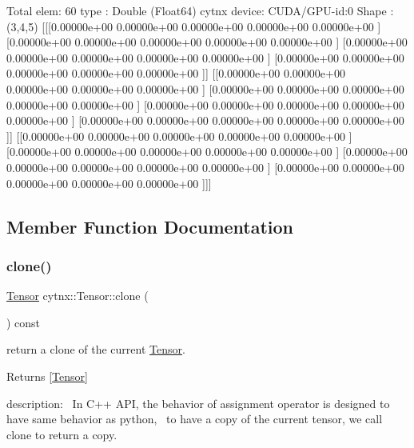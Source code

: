\begin{DoxyVerbInclude}
Total elem: 60
type  : Double (Float64)
cytnx device: CUDA/GPU-id:0
Shape : (3,4,5)
[[[0.00000e+00 0.00000e+00 0.00000e+00 0.00000e+00 0.00000e+00 ]
  [0.00000e+00 0.00000e+00 0.00000e+00 0.00000e+00 0.00000e+00 ]
  [0.00000e+00 0.00000e+00 0.00000e+00 0.00000e+00 0.00000e+00 ]
  [0.00000e+00 0.00000e+00 0.00000e+00 0.00000e+00 0.00000e+00 ]]
 [[0.00000e+00 0.00000e+00 0.00000e+00 0.00000e+00 0.00000e+00 ]
  [0.00000e+00 0.00000e+00 0.00000e+00 0.00000e+00 0.00000e+00 ]
  [0.00000e+00 0.00000e+00 0.00000e+00 0.00000e+00 0.00000e+00 ]
  [0.00000e+00 0.00000e+00 0.00000e+00 0.00000e+00 0.00000e+00 ]]
 [[0.00000e+00 0.00000e+00 0.00000e+00 0.00000e+00 0.00000e+00 ]
  [0.00000e+00 0.00000e+00 0.00000e+00 0.00000e+00 0.00000e+00 ]
  [0.00000e+00 0.00000e+00 0.00000e+00 0.00000e+00 0.00000e+00 ]
  [0.00000e+00 0.00000e+00 0.00000e+00 0.00000e+00 0.00000e+00 ]]]





\end{DoxyVerbInclude}
 

\subsection{Member Function Documentation}
\mbox{\label{classcytnx_1_1Tensor_a5e2248e9babdb786167ed349df9084ae}} 
\subsubsection{\texorpdfstring{clone()}{clone()}}
{\footnotesize\ttfamily \hyperlink{classcytnx_1_1Tensor}{Tensor} cytnx\+::\+Tensor\+::clone (\begin{DoxyParamCaption}{ }\end{DoxyParamCaption}) const\hspace{0.3cm}{\ttfamily [inline]}}



return a clone of the current \hyperlink{classcytnx_1_1Tensor}{Tensor}. 

\begin{DoxyReturn}{Returns}
\mbox{[}\hyperlink{classcytnx_1_1Tensor}{Tensor}\mbox{]}
\end{DoxyReturn}
description\+:~\newline
 In C++ A\+PI, the behavior of assignment operator is designed to have same behavior as python,~\newline
 to have a copy of the current tensor, we call clone to return a copy.

